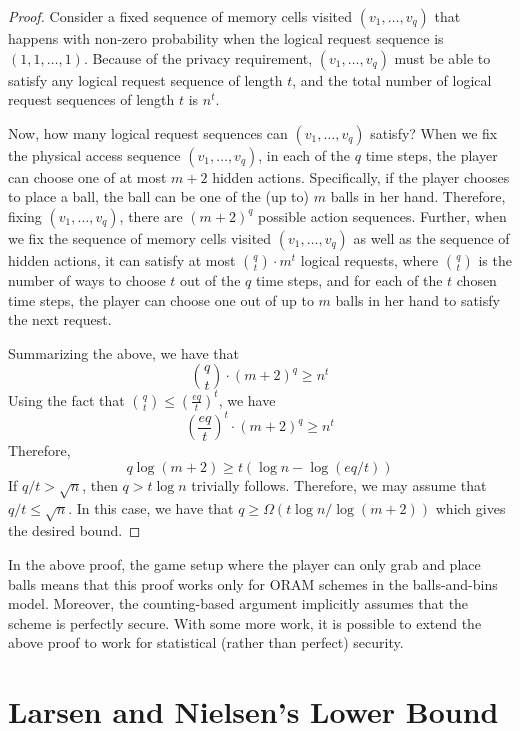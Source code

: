 \begin{proof}
Consider a fixed sequence of memory cells visited 
$(v_1, \ldots, v_q)$ 
that happens with non-zero probability 
when the logical request sequence is $(1, 1, \ldots, 1)$.
Because of the privacy requirement, 
$(v_1, \ldots, v_q)$ 
must be able to satisfy any logical request
sequence of length $t$, and the total number
of logical request sequences of length $t$ is $n^t$.

Now, how many logical request sequences
can $(v_1, \ldots, v_q)$ 
satisfy? 
When we fix %
the physical access sequence 
$(v_1, \ldots, v_q)$, 
in each of the 
$q$ time steps, the player can choose 
one of at most $m+2$ hidden actions. 
Specifically, if the player chooses to place a ball,
the ball can be 
one of the (up to) $m$ balls in her hand. 
Therefore, fixing $(v_1, \ldots, v_q)$, there are 
$(m+2)^q$ possible 
action sequences.
Further, when we fix the sequence of memory cells
visited $(v_1, \ldots, v_q)$
as well as the sequence of hidden actions, 
it 
can satisfy at most ${q \choose t} \cdot m^t$
logical requests, where $q \choose t$ is the number
of ways to choose $t$ out of the $q$ time steps,
and for each of the $t$ chosen time steps, the player can choose
one out of up to $m$ balls in her hand to satisfy the next request.

Summarizing the above, we have
that 
\[
{q \choose t} \cdot (m+2)^q \geq n^t
\]
Using the fact that ${q \choose t} \leq \left(\frac{eq}{t}\right)^t$, we have
\[
\left(\frac{eq}{t}\right)^t\cdot (m+2)^q \geq n^t
\]
Therefore,
\[
q \log(m+2) \geq t (\log n  -  \log (eq/t))
\]
If $q/t > \sqrt{n}$, then $q > t \log n$ trivially follows.
Therefore, we may assume that $q/t \leq \sqrt{n}$.  
In this case, 
we have that 
$q \geq \Omega(t\log n/\log(m+2))$ which gives the desired bound. 
\end{proof}

In the above proof, 
the game setup
where the player can only grab and place
balls means that this proof works only 
for ORAM schemes in the balls-and-bins model.
Moreover,  the counting-based argument %
implicitly assumes that the 
scheme is perfectly secure.
With some more work,
it is possible to extend the above proof to 
work for statistical (rather than 
perfect) security. 

\section{Larsen and Nielsen's Lower Bound}

